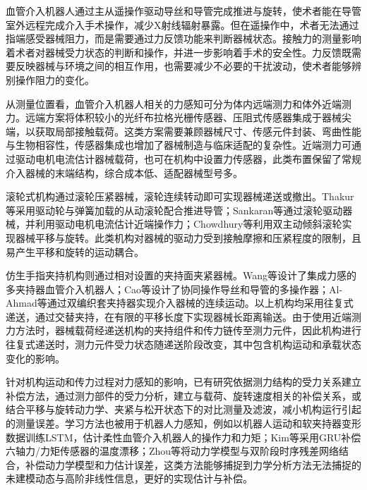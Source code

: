 \documentclass{JQR_LaTeX_Template-0507/JQRnewSubmission}
\begin{document}
\maketitle
\raggedbottom

\makeatletter
{}
\makeatother
血管介入机器人通过主从遥操作驱动导丝和导管完成推进与旋转，使术者能在导管室外远程完成介入手术操作，减少X射线辐射暴露。但在遥操作中，术者无法通过指端感受器械阻力，而是需要通过力反馈功能来判断器械状态。接触力的测量影响着术者对器械受力状态的判断和操作，并进一步影响着手术的安全性。力反馈既需要反映器械与环境之间的相互作用，也需要减少不必要的干扰波动，使术者能够辨别操作阻力的变化。

 从测量位置看，血管介入机器人相关的力感知可分为体内远端测力和体外近端测力。远端方案将体积较小的光纤布拉格光栅传感器、压阻式传感器集成于器械尖端，以获取局部接触载荷。这类方案需要兼顾器械尺寸、传感元件封装、弯曲性能与生物相容性，传感器集成也增加了器械制造与临床适配的复杂性。近端测力可通过驱动电机电流估计器械载荷，也可在机构中设置力传感器，此类布置保留了常规介入器械的末端结构，综合成本低、适配器械型号多。

滚轮式机构通过滚轮压紧器械，滚轮连续转动即可实现器械递送或撤出。Thakur等采用驱动轮与弹簧加载的从动滚轮配合推进导管；Sankaran等通过滚轮驱动器械，并利用驱动电机电流估计近端操作力；Chowdhury等利用双主动倾斜滚轮实现器械平移与旋转。此类机构对器械的驱动力受到接触摩擦和压紧程度的限制，且易产生平移和旋转的运动耦合。

 仿生手指夹持机构则通过相对设置的夹持面夹紧器械。Wang等设计了集成力感的多夹持器血管介入机器人；Cao等设计了协同操作导丝和导管的多操作器；Al-Ahmad等通过双编织套夹持器实现介入器械的连续运动。以上机构均采用往复式递送，通过交替夹持，在有限的平移长度下实现器械长距离输送。由于使用近端测力方法时，器械载荷经递送机构的夹持组件和传力链传至测力元件，因此机构进行往复式递送时，测力元件受力状态随递送阶段改变，其中包含机构运动和承载状态变化的影响。

 针对机构运动和传力过程对力感知的影响，已有研究依据测力结构的受力关系建立补偿方法，通过测力部件的受力分析，建立与载荷、旋转速度相关的补偿关系，或结合平移与旋转动力学、夹紧与松开状态下的对比测量及滤波，减小机构运行引起的测量误差。学习方法也被用于机器人力感知，例如以机器人运动和软夹持器变形数据训练LSTM，估计柔性血管介入机器人的操作力和力矩；Kim等采用GRU补偿六轴力/力矩传感器的温度漂移；Zhou等将动力学模型与双阶段时序残差网络结合，补偿动力学模型和力估计误差，这类方法能够捕捉到力学分析方法无法捕捉的未建模动态与高阶非线性信息，更好的实现估计与补偿。
\end{document}
